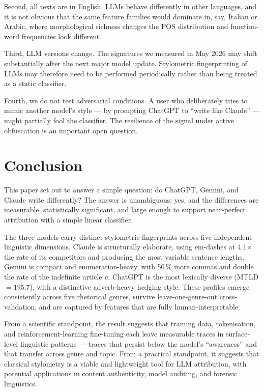 \documentclass[11pt,a4paper]{article}
\begin{document}
Second, all texts are in English. LLMs behave differently in other
languages, and it is not obvious that the same feature families would
dominate in, say, Italian or Arabic, where morphological richness
changes the POS distribution and function-word frequencies look
different.

Third, LLM versions change. The signatures we measured in May 2026
may shift substantially after the next major model update. Stylometric
fingerprinting of LLMs may therefore need to be performed periodically
rather than being treated as a static classifier.

Fourth, we do not test adversarial conditions. A user who deliberately
tries to mimic another model's style --- by prompting ChatGPT to
``write like Claude'' --- might partially fool the classifier. The
resilience of the signal under active obfuscation is an important open
question.

\section{Conclusion}
\label{sec:conclusion}

This paper set out to answer a simple question: do ChatGPT, Gemini,
and Claude write differently? The answer is unambiguous: yes, and
the differences are measurable, statistically significant, and large
enough to support near-perfect attribution with a simple linear
classifier.

The three models carry distinct stylometric fingerprints across five
independent linguistic dimensions. Claude is structurally elaborate,
using em-dashes at 4.1$\times$ the rate of its competitors and
producing the most variable sentence lengths. Gemini is compact and
enumeration-heavy, with 50\,\% more commas and double the rate of
the indefinite article \textit{a}. ChatGPT is the most lexically
diverse (MTLD $= 195.7$), with a distinctive adverb-heavy hedging
style. These profiles emerge consistently across five rhetorical
genres, survive leave-one-genre-out cross-validation, and are
captured by features that are fully human-interpretable.

From a scientific standpoint, the result suggests that training data,
tokenisation, and reinforcement-learning fine-tuning each leave
measurable traces in surface-level linguistic patterns --- traces that
persist below the model's ``awareness'' and that transfer across genre
and topic. From a practical standpoint, it suggests that classical
stylometry is a viable and lightweight tool for LLM attribution, with
potential applications in content authenticity, model auditing, and
forensic linguistics.
\end{document}
